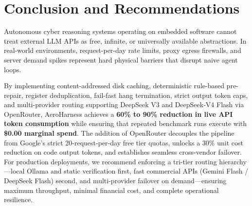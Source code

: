 \documentclass[11pt,a4paper]{article}
\begin{document}
\section{Conclusion and Recommendations}

Autonomous cyber reasoning systems operating on embedded software cannot treat external LLM APIs as free, infinite, or universally available abstractions. In real-world environments, request-per-day rate limits, proxy egress firewalls, and server demand spikes represent hard physical barriers that disrupt naive agent loops.

By implementing content-addressed disk caching, deterministic rule-based pre-repair, register deduplication, fail-fast hang termination, strict output token caps, and multi-provider routing supporting DeepSeek V3 and DeepSeek-V4 Flash via OpenRouter, AeroHarness achieves a \textbf{60\% to 90\% reduction in live API token consumption} while ensuring that repeated benchmark runs execute with \textbf{\$0.00 marginal spend}. The addition of OpenRouter decouples the pipeline from Google's strict 20-request-per-day free tier quotas, unlocks a 30\% unit cost reduction on code output tokens, and establishes seamless cross-vendor failover. For production deployments, we recommend enforcing a tri-tier routing hierarchy---local Ollama and static verification first, fast commercial APIs (Gemini Flash / DeepSeek Flash) second, and multi-provider failover on demand---ensuring maximum throughput, minimal financial cost, and complete operational resilience.
\end{document}
